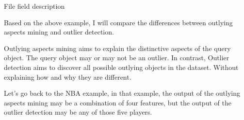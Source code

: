 \documentclass[
 size=14pt,
 paper=smartboard,  %
 mode=present, 		%
 display=slides, 	%
 style=tuliplab,  	%
 pauseslide,
 fleqn,leqno]{powerdot}
\begin{document}
\begin{slide}[toc=,bm=]{File field description}
\begin{center}

\end{center}

\bigskip


\begin{note}
Based on the above example,
I will compare the differences
between outlying aspects mining and outlier detection.

Outlying aspects mining aims to
explain the distinctive aspects of the query object.
The query object may or may not be an outlier.
In contrast,
Outlier detection aims to discover all possible
outlying objects in the dataset.
Without explaining how and why they are different.

Let's go back to the NBA example,
in that example,
the output of the outlying aspects mining may be
a combination of four features,
but the output of the outlier detection may be any of those five players.
\end{note}

\end{slide}
\end{document}
